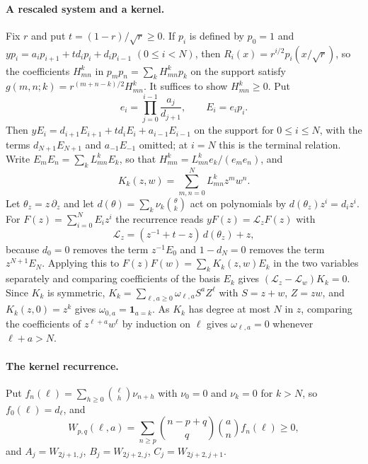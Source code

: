 \paragraph{A rescaled system and a kernel.}
Fix $r$ and put $t=(1-r)/\sqrt r\geq0$. If $p_i$ is defined by $p_0=1$ and $yp_i=a_ip_{i+1}+td_ip_i+d_ip_{i-1}$ $(0\leq i<N)$, then $R_i(x)=r^{i/2}p_i(x/\sqrt r)$, so the coefficients $H_{mn}^k$ in $p_mp_n=\sum_kH_{mn}^kp_k$ on the support satisfy $g(m,n;k)=r^{(m+n-k)/2}H_{mn}^k$. It suffices to show $H_{mn}^k\geq0$. Put
\[
e_i=\prod_{j=0}^{i-1}\frac{a_j}{d_{j+1}},\qquad E_i=e_ip_i.
\]
Then $yE_i=d_{i+1}E_{i+1}+td_iE_i+a_{i-1}E_{i-1}$ on the support for $0\leq i\leq N$, with the terms $d_{N+1}E_{N+1}$ and $a_{-1}E_{-1}$ omitted; at $i=N$ this is the terminal relation. Write $E_mE_n=\sum_kL_{mn}^kE_k$, so that $H_{mn}^k=L_{mn}^ke_k/(e_me_n)$, and
\[
K_k(z,w)=\sum_{m,n=0}^NL_{mn}^kz^mw^n.
\]
Let $\theta_z=z\,\partial_z$ and let $d(\theta)=\sum_k\nu_k\binom\theta k$ act on polynomials by $d(\theta_z)z^i=d_iz^i$. For $F(z)=\sum_{i=0}^NE_iz^i$ the recurrence reads $yF(z)=\mathcal L_zF(z)$ with
\[
\mathcal L_z=(z^{-1}+t-z)\,d(\theta_z)+z,
\]
because $d_0=0$ removes the term $z^{-1}E_0$ and $1-d_N=0$ removes the term $z^{N+1}E_N$. Applying this to $F(z)F(w)=\sum_kK_k(z,w)E_k$ in the two variables separately and comparing coefficients of the basis $E_k$ gives $(\mathcal L_z-\mathcal L_w)K_k=0$. Since $K_k$ is symmetric, $K_k=\sum_{\ell,a\geq0}\omega_{\ell,a}S^aZ^\ell$ with $S=z+w$, $Z=zw$, and $K_k(z,0)=z^k$ gives $\omega_{0,a}=\mathbf1_{a=k}$. As $K_k$ has degree at most $N$ in $z$, comparing the coefficients of $z^{\ell+a}w^\ell$ by induction on $\ell$ gives $\omega_{\ell,a}=0$ whenever $\ell+a>N$.

\paragraph{The kernel recurrence.}
Put $f_n(\ell)=\sum_{h\geq0}\binom\ell h\nu_{n+h}$ with $\nu_0=0$ and $\nu_k=0$ for $k>N$, so $f_0(\ell)=d_\ell$, and
\[
W_{p,q}(\ell,a)=\sum_{n\geq p}\binom{n-p+q}q\binom an f_n(\ell)\geq0,
\]
and $A_j=W_{2j+1,j}$, $B_j=W_{2j+2,j}$, $C_j=W_{2j+2,j+1}$.

